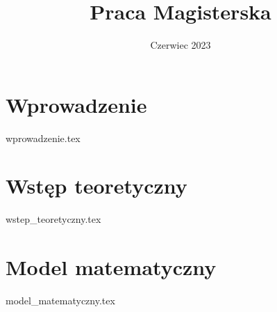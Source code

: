 \documentclass{pracamgr}
\title{Praca Magisterska}
\date{Czerwiec 2023}
\begin{document}
\maketitle

\begin{abstract}
    
\end{abstract}

\tableofcontents

\chapter{Wprowadzenie}
{wprowadzenie.tex}

\chapter{Wstęp teoretyczny}
{wstep_teoretyczny.tex}

\chapter{Model matematyczny}
{model_matematyczny.tex}

\printbibliography
\end{document}
